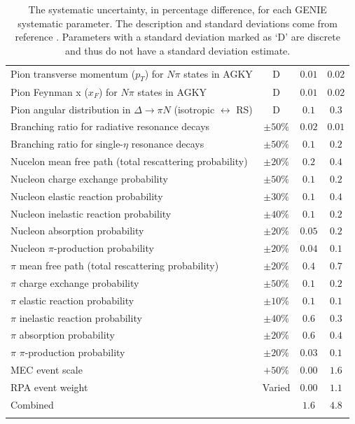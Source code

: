 \begin{longtable}{p{3.25in} c c c}
  Pion transverse momentum ($p_T$) for $N\pi$ states \newline in AGKY & D & $0.01$ & $0.02$ \\
  Pion Feynman x ($x_F$) for $N\pi$ states in AGKY & D & $0.01$ & $0.02$ \\
  Pion angular distribution in $\Delta \rightarrow \pi N$ \newline (isotropic $\leftrightarrow$ RS) & D & $0.1$ & $0.3$ \\
  Branching ratio for radiative resonance decays & $\pm50\%$ & $0.02$ & $0.01$ \\
  Branching ratio for single-$\eta$ resonance decays & $\pm50\%$ & $0.1$ & $0.2$ \\
  Nucelon mean free path (total rescattering \newline probability) & $\pm20\%$ & $0.2$ & $0.4$ \\
  Nucleon charge exchange probability & $\pm50\%$ & $0.1$ & $0.2$ \\
  Nucleon elastic reaction probability & $\pm30\%$ & $0.1$ & $0.4$ \\
  Nucleon inelastic reaction probability & $\pm40\%$ & $0.1$ & $0.2$ \\
  Nucleon absorption probability & $\pm20\%$ & $0.05$ & $0.2$ \\
  Nucleon $\pi$-production probability & $\pm20\%$ & $0.04$ & $0.1$ \\
  $\pi$ mean free path (total rescattering probability) & $\pm20\%$ & $0.4$ & $0.7$ \\
  $\pi$ charge exchange probability & $\pm50\%$ & $0.1$ & $0.2$ \\
  $\pi$ elastic reaction probability & $\pm10\%$ & $0.1$ & $0.1$ \\
  $\pi$ inelastic reaction probability & $\pm40\%$ & $0.6$ & $0.3$ \\
  $\pi$ absorption probability & $\pm20\%$ & $0.6$ & $0.4$ \\
  $\pi$ $\pi$-production probability & $\pm20\%$ & $0.03$ & $0.1$ \\
  MEC event scale & $+50\%$ & $0.00$ & $1.6$ \\
  RPA event weight & Varied & $0.00$ & $1.1$ \\
  \hline
  Combined & & $1.6$ & $4.8$ \\
  \hline
  \caption[GENIE Systematic Uncertainties]{The systematic uncertainty, in percentage difference, for each GENIE systematic parameter. The description and standard deviations come from reference \cite{ref:GENIE, ref:TNGENIE}. Parameters with a standard deviation marked as `D' are discrete and thus do not have a standard deviation estimate.}
  \label{tab:SystGENIE}
\end{longtable}
\doublespacing

